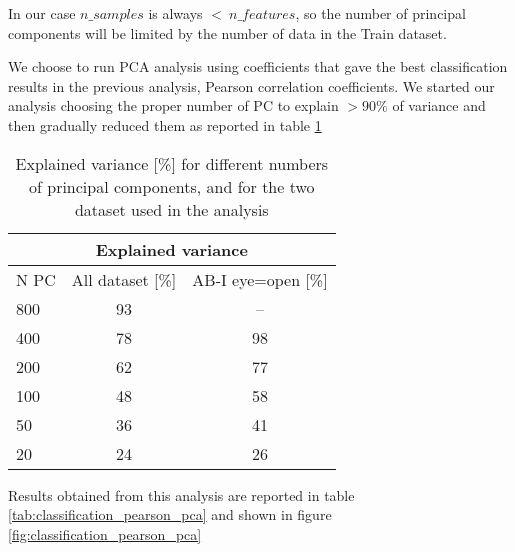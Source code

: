 \documentclass[11pt]{report}
\begin{document}
In our case $n\_samples$ is always $< \ n\_features$, so the number of principal components will be limited by the number of data in the Train dataset.

We choose to run PCA analysis using coefficients that gave the best classification results in the previous analysis, Pearson correlation coefficients.
We started our analysis choosing the proper number of PC to explain $> 90\%$ of variance and then gradually reduced them as reported in table \ref{tab:pca_explained}

\begin{table}
\centering
\begin{tabular}{ |l|c c| }
\hline
\multicolumn{3}{|c|}{Explained variance} \\
 \hline
  N PC & All dataset [\%] & AB-I eye=open [\%] \\
  \hline
 800 & 93 & -- \\
 400 & 78 & 98 \\
 200 & 62 & 77 \\
 100 &48 & 58 \\
 50 & 36 & 41 \\
 20 & 24 & 26\\
 \hline
\end{tabular}
\caption{Explained variance [\%] for different numbers of principal components, and for the two dataset used in the analysis}
\label{tab:pca_explained}
\end{table}



Results obtained from this analysis are reported in table \ref{tab:classification_pearson_pca} and shown in figure \ref{fig:classification_pearson_pca}
\end{document}
